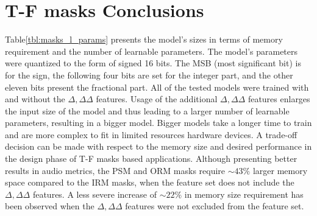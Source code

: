 




\section{T-F masks Conclusions}
Table\;\ref{tbl:masks_l_params} presents
the model's sizes in terms of memory requirement
and the number of learnable parameters.
The model's parameters were quantized
to the form of signed 16 bits. 
The MSB (most significant bit) is for the sign,
the following four bits are set for the integer part,
and the other eleven bits present the fractional part.
All of the tested models were trained with and without
the \(\Delta, \Delta\Delta\) features.
Usage of the additional \(\Delta, \Delta\Delta\) features
enlarges the input size of the model and thus
leading to a larger number of learnable parameters, resulting
in a bigger model. Bigger models take a longer time to train
and are more complex to fit in limited resources hardware 
devices. A trade-off decision can be made with respect to
the memory size and desired performance in the design phase
of T-F masks based applications. Although presenting
better results in audio metrics, the PSM and ORM
masks require \(\sim 43\%\) larger memory space
compared to the IRM masks, 
when the feature set does not include
the \(\Delta, \Delta\Delta\) features.
A less severe increase of \(\sim 22\%\) in memory 
size requirement has been observed 
when the \(\Delta, \Delta\Delta\) features
were not excluded from the feature set.




